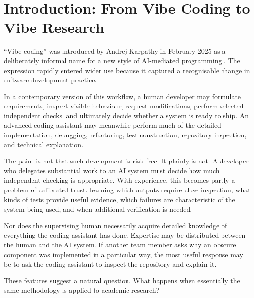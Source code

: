 \begin{abstract}
Our purpose is not to argue that vibe research is risk-free, nor to propose a general rule for AI authorship. We instead identify an asymmetry between software engineering and academic research, examine some of its conceptual, technical, and institutional foundations, and ask whether current academic conventions accurately describe emerging forms of human--AI research collaboration.
\end{abstract}


\section{Introduction: From Vibe Coding to Vibe Research}

``Vibe coding'' was introduced by Andrej Karpathy in February 2025 as a deliberately informal name for a new style of AI-mediated programming \citep{fowler2026vibecoding}. The expression rapidly entered wider use because it captured a recognisable change in software-development practice.

In a contemporary version of this workflow, a human developer may formulate requirements, inspect visible behaviour, request modifications, perform selected independent checks, and ultimately decide whether a system is ready to ship. An advanced coding assistant may meanwhile perform much of the detailed implementation, debugging, refactoring, test construction, repository inspection, and technical explanation.

The point is not that such development is risk-free. It plainly is not. A developer who delegates substantial work to an AI system must decide how much independent checking is appropriate. With experience, this becomes partly a problem of calibrated trust: learning which outputs require close inspection, what kinds of tests provide useful evidence, which failures are characteristic of the system being used, and when additional verification is needed.

Nor does the supervising human necessarily acquire detailed knowledge of everything the coding assistant has done. Expertise may be distributed between the human and the AI system. If another team member asks why an obscure component was implemented in a particular way, the most useful response may be to ask the coding assistant to inspect the repository and explain it.

These features suggest a natural question. What happens when essentially the same methodology is applied to academic research?

